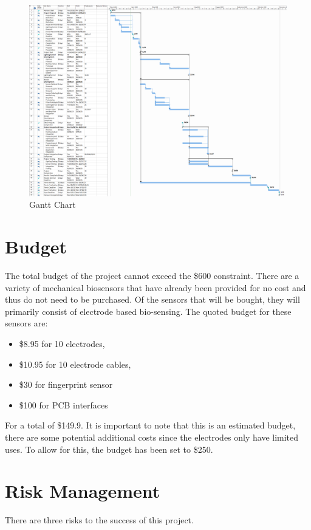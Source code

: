\begin{figure}[!ht]
    \caption{Gantt Chart}\label{fig:gantt}
    \centering
    \includegraphics[width=2\columnwidth]{chapters/project_plan/figures/Gantt_Chart}
\end{figure}

\section{Budget}
The total budget of the project cannot exceed the \$600 constraint.
There are a variety of mechanical biosensors that have already been provided for no cost and thus do not need to be purchased.
Of the sensors that will be bought, they will primarily consist of electrode based bio-sensing.
The quoted budget for these sensors are:

\begin{itemize}
    \item \$8.95 for 10 electrodes,
    \item \$10.95 for 10 electrode cables,
    \item \$30 for fingerprint sensor
    \item \$100 for PCB interfaces
\end{itemize}

For a total of \$149.9.
It is important to note that this is an estimated budget,
there are some potential additional costs since the electrodes only have limited uses.
To allow for this, the budget has been set to \$250.

\section{Risk Management}
There are three risks to the success of this project.

